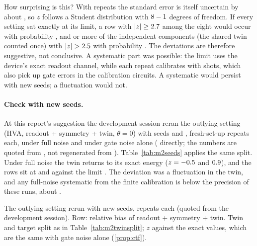 How surprising is this? With \VMbRepeats{} repeats the standard error is itself uncertain by about
\VMbSpreadRelErr, so $z$ follows a Student distribution with $8-1$ degrees of freedom.
If every setting sat exactly at its limit, a row with $|z|\ge2.7$ among the eight
would occur with probability \VMbPRow, and \VMbCompOver{} or more of the \VMbCompN{} independent
components (the shared twin counted once) with $|z|>\VMbCompCut$ with probability \VMbPComp. The deviations are therefore suggestive, not
conclusive. A systematic part was possible: the limit uses the device's exact readout channel,
while each repeat calibrates with \VMbSetupRo{} shots, which also pick up gate errors in the
calibration circuits. A systematic would persist with new seeds; a fluctuation would not.

\paragraph{Check with new seeds.} At this report's suggestion the development session reran the
outlying setting (HVA, readout + symmetry + twin, $\theta=0$) with seeds \VMqSeedA{} and
\VMqSeedB, \VMqRepeats{} fresh-set-up repeats each, under full noise and under gate noise alone
( directly; the numbers are quoted from , not regenerated
from ). Table~\ref{tab:m2seeds} applies the same split. Under full noise the twin
returns to its exact energy ($z=-0.5$ and $0.9$), and the rows sit at
\VMqRowFullA{} and \VMqRowFullB{} against the limit \VMxTwHvaZeroFullCtfRel. The deviation was a
fluctuation in the twin, and any full-noise systematic from the finite calibration is below the
precision of these runs, about \VMqRowSemFullA.

\begin{table}[H]
  \centering
  \small
  \begin{adjustbox}{max width=\linewidth}
    
  \end{adjustbox}
  \caption{The outlying setting rerun with new seeds, \VMqRepeats{} repeats each (quoted from the
    development session). Row: relative bias of readout + symmetry + twin. Twin and target split
    as in Table~\ref{tab:m2twinsplit}; $z$ against the exact values, which are the same with
    gate noise alone (\cref{prop:ctf}).}
  \label{tab:m2seeds}
\end{table}


